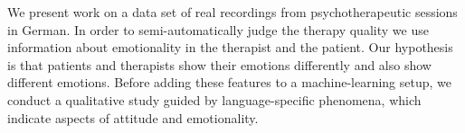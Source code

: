 We present work on a data set of real recordings from psychotherapeutic sessions in German. In order to semi-automatically judge the therapy quality we use information about emotionality in the therapist and the patient. Our hypothesis is that patients and therapists show their emotions differently and also show different emotions. Before adding these features to a machine-learning setup, we conduct a qualitative study guided by language-specific phenomena, which indicate aspects of attitude and emotionality.
